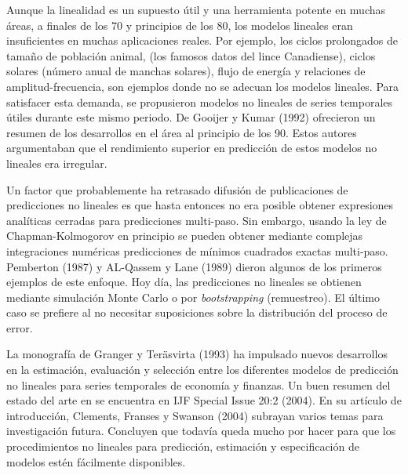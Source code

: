 \documentclass{llncs}
\begin{document}
Aunque la linealidad es un supuesto útil y una herramienta potente  en muchas áreas, a finales de los 70 y principios de los 80, los modelos lineales eran insuficientes en muchas aplicaciones reales. Por ejemplo, los ciclos prolongados de tamaño de población animal, (los famosos datos del lince Canadiense), ciclos solares (número anual de manchas solares), flujo de energía y relaciones de amplitud-frecuencia, son ejemplos donde no se adecuan los modelos lineales. Para satisfacer esta demanda, se propusieron modelos no lineales de series temporales útiles durante este mismo periodo. De Gooijer y Kumar (1992)  \cite{DeGooijer1992135} ofrecieron un resumen de los desarrollos en el área al principio de los 90. Estos autores argumentaban que el rendimiento superior en predicción de estos modelos no lineales era irregular.

Un factor que probablemente ha retrasado difusión de publicaciones de predicciones no lineales es que hasta entonces no era posible obtener expresiones analíticas cerradas para predicciones multi-paso. Sin embargo, usando la ley de  Chapman-Kolmogorov en principio se pueden obtener mediante complejas integraciones numéricas predicciones de mínimos cuadrados exactas multi-paso. Pemberton (1987)  \cite{Pemberton1987443} y AL-Qassem y Lane (1989)  \cite{Al-Qassam198995}dieron algunos de los primeros ejemplos de este enfoque. Hoy día, las predicciones no lineales se obtienen mediante simulación Monte Carlo o por \emph{bootstrapping} (remuestreo). El último caso se prefiere al no necesitar suposiciones sobre la distribución del proceso de error.

La monografía de Granger y Teräsvirta (1993)  \cite{Granger1993} ha impulsado nuevos desarrollos en la estimación, evaluación y selección entre los diferentes modelos de predicción no lineales para series temporales de economía y finanzas. Un buen resumen del estado del arte en se encuentra en IJF Special Issue 20:2 (2004). En su artículo de introducción, Clements, Franses y Swanson (2004)  \cite{Clements2004169} subrayan varios temas para investigación futura. Concluyen que todavía queda mucho por hacer para que los procedimientos no lineales para predicción, estimación y especificación de modelos estén fácilmente disponibles.
\end{document}
